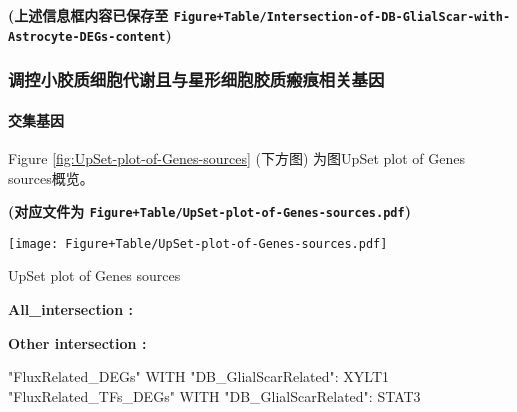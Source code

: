 \documentclass[
]{article}
\begin{document}
\textbf{(上述信息框内容已保存至 \texttt{Figure+Table/Intersection-of-DB-GlialScar-with-Astrocyte-DEGs-content})}

\hypertarget{ux8c03ux63a7ux5c0fux80f6ux8d28ux7ec6ux80deux4ee3ux8c22ux4e14ux4e0eux661fux5f62ux7ec6ux80deux80f6ux8d28ux7622ux75d5ux76f8ux5173ux57faux56e0}{%
\subsubsection{调控小胶质细胞代谢且与星形细胞胶质瘢痕相关基因}\label{ux8c03ux63a7ux5c0fux80f6ux8d28ux7ec6ux80deux4ee3ux8c22ux4e14ux4e0eux661fux5f62ux7ec6ux80deux80f6ux8d28ux7622ux75d5ux76f8ux5173ux57faux56e0}}

\hypertarget{ux4ea4ux96c6ux57faux56e0}{%
\paragraph{交集基因}\label{ux4ea4ux96c6ux57faux56e0}}

Figure \ref{fig:UpSet-plot-of-Genes-sources} (下方图) 为图UpSet plot of Genes sources概览。

\textbf{(对应文件为 \texttt{Figure+Table/UpSet-plot-of-Genes-sources.pdf})}

\def\@captype{figure}
\begin{center}
\texttt{[image: Figure+Table/UpSet-plot-of-Genes-sources.pdf]}
\caption{UpSet plot of Genes sources}\label{fig:UpSet-plot-of-Genes-sources}
\end{center}
\begin{center}\begin{tcolorbox}[colback=gray!10, colframe=gray!50, width=0.9\linewidth, arc=1mm, boxrule=0.5pt]
\textbf{
All\_intersection
:}

\vspace{0.5em}



\vspace{2em}


\textbf{
Other intersection
:}

\vspace{0.5em}

    "FluxRelated\_DEGs" WITH "DB\_GlialScarRelated": XYLT1
\newline "FluxRelated\_TFs\_DEGs" WITH "DB\_GlialScarRelated":
STAT3

\vspace{2em}
\end{tcolorbox}
\end{center}
\end{document}
